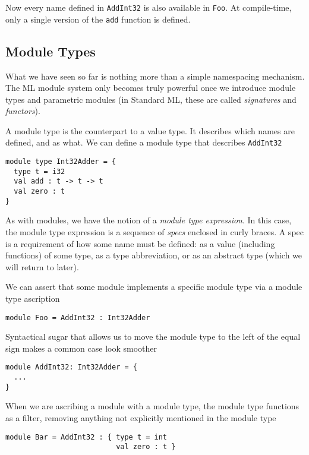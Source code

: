 \documentclass[oneside,11pt]{book}
\begin{document}
Now every name defined in \texttt{AddInt32} is also available in
\texttt{Foo}.  At compile-time, only a single version of the
\texttt{add} function is defined.

\subsection{Module Types}

What we have seen so far is nothing more than a simple namespacing
mechanism.  The ML module system only becomes truly powerful once we
introduce module types and parametric modules (in Standard ML, these
are called \textit{signatures} and \textit{functors}).

A module type is the counterpart to a value type.  It describes which
names are defined, and as what.  We can define a module type that
describes \texttt{AddInt32}

\begin{lstlisting}
module type Int32Adder = {
  type t = i32
  val add : t -> t -> t
  val zero : t
}
\end{lstlisting}

As with modules, we have the notion of a \textit{module type expression}.  In
this case, the module type expression is a sequence of \textit{specs}
enclosed in curly braces.  A spec is a requirement of how some name
must be defined: as a value (including functions) of some type, as a
type abbreviation, or as an abstract type (which we will return to
later).

We can assert that some module implements a specific module type via
a module type ascription

\begin{lstlisting}
module Foo = AddInt32 : Int32Adder
\end{lstlisting}

Syntactical sugar that allows us to move the module type to the left
of the equal sign makes a common case look smoother

\begin{lstlisting}
module AddInt32: Int32Adder = {
  ...
}
\end{lstlisting}

When we are ascribing a module with a module type, the module type
functions as a filter, removing anything not explicitly mentioned in
the module type

\begin{lstlisting}
module Bar = AddInt32 : { type t = int
                          val zero : t }
\end{lstlisting}
\end{document}
